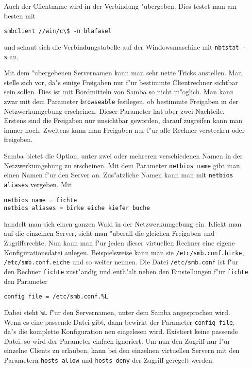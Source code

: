 \documentclass{scrartcl}
\newcommand{\param}{\texttt}
\newcommand{\datei}{\texttt}
\newcommand{\nbname}{\texttt}
\begin{document}
Auch der Clientname wird in der Verbindung "ubergeben. Dies testet man
am besten mit

\verb|smbclient //win/c\$ -n blafasel| 

\noindent und schaut sich
die Verbindungstabelle auf der Windowsmaschine mit \verb|nbtstat -s|
an.

Mit dem "ubergebenen Servernamen kann man sehr nette Tricks anstellen.
Man stelle sich vor, da"s einige Freigaben nur f"ur bestimmte
Clientrechner sichtbar sein sollen. Dies ist mit Bordmitteln von Samba
so nicht m"oglich. Man kann zwar mit dem Parameter \param{browseable}
festlegen, ob bestimmte Freigaben in der Netzwerkumgebung erscheinen.
Dieser Parameter hat aber zwei Nachteile.  Erstens sind die Freigaben nur
unsichtbar geworden, darauf zugreifen kann man immer noch. Zweitens kann man
Freigaben nur f"ur alle Rechner verstecken oder freigeben.

Samba bietet die Option, unter zwei oder mehreren verschiedenen Namen
in der Netzwerkumgebung zu erscheinen. Mit dem Parameter
\param{netbios name} gibt man einen Namen f"ur den Server an.
Zus"atzliche Namen kann man mit \param{netbios aliases} vergeben. Mit

\begin{verbatim}
netbios name = fichte
netbios aliases = birke eiche kiefer buche
\end{verbatim}

\noindent
handelt man sich einen ganzen Wald in der Netzwerkumgebung ein. Klickt
man auf die einzelnen Server, sieht man "uberall die gleichen
Freigaben und Zugriffsrechte. Nun kann man f"ur jeden dieser
virtuellen Rechner eine eigene Konfigurationsdatei anlegen.
Beispielsweise kann man sie \datei{/etc/smb.conf.birke},
\datei{/etc/smb.conf.eiche} und so weiter nennen. Die Datei
\datei{/etc/smb.conf} ist f"ur den Rechner \nbname{fichte} zust"andig
und enth"alt neben den Einstellungen f"ur \nbname{fichte} den
Parameter 

\param{config file = /etc/smb.conf.\%L}

\noindent Dabei steht
\param{\%L} f"ur den Servernamen, unter dem Samba angesprochen wird.
Wenn es eine passende Datei gibt, dann bewirkt der Parameter
\param{config file}, da"s die komplette Konfiguration neu eingelesen
wird. Existiert keine passende Datei, so wird der Parameter einfach
ignoriert. Um nun den Zugriff nur f"ur einzelne Clients zu erlauben,
kann bei den einzelnen virtuellen Servern mit den Parametern
\param{hosts allow} und \param{hosts deny} der Zugriff geregelt
werden.
\end{document}
